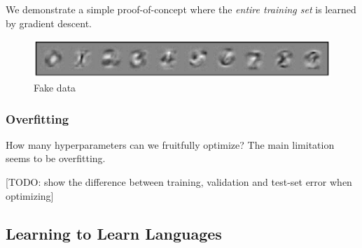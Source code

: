 \documentclass{article}
\begin{document}
We demonstrate a simple proof-of-concept where the \emph{entire training set} is learned by gradient descent.

\begin{figure}[h!]
\begin{center}
\includegraphics[width=\columnwidth]{../experiments/Jan_19_optimize_data/4/fake_data.pdf}
\caption{Fake data}
\label{fig:logistic ard}
\end{center}
\end{figure} 


\subsubsection{Overfitting}

How many hyperparameters can we fruitfully optimize?
The main limitation seems to be overfitting.

[TODO: show the difference between training, validation and test-set error when optimizing]


\subsection{Learning to Learn Languages}
\end{document}
